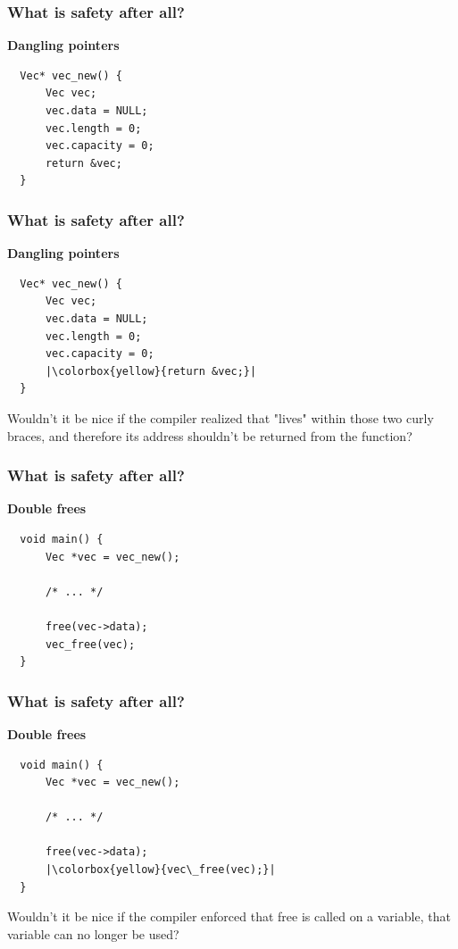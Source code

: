 \documentclass[aspectratio=1610,t]{beamer}
\begin{document}

\begin{frame}[fragile]
\frametitle{What is safety after all?}
\textbf{Dangling pointers}

\begin{verbatim}
  Vec* vec_new() {
      Vec vec;
      vec.data = NULL;
      vec.length = 0;
      vec.capacity = 0;
      return &vec;
  }
\end{verbatim}

\end{frame}


\begin{frame}[fragile]
\frametitle{What is safety after all?}
\textbf{Dangling pointers}

\begin{verbatim}
  Vec* vec_new() {
      Vec vec;
      vec.data = NULL;
      vec.length = 0;
      vec.capacity = 0;
      |\colorbox{yellow}{return &vec;}|
  }
\end{verbatim}

Wouldn't it be nice if the compiler realized that  "lives" within those two curly braces, and therefore its address shouldn't be returned from the function?

\end{frame}


\begin{frame}[fragile]
\frametitle{What is safety after all?}
\textbf{Double frees}

\begin{verbatim}
  void main() {
      Vec *vec = vec_new();

      /* ... */

      free(vec->data);
      vec_free(vec);
  }
\end{verbatim}

\end{frame}


\begin{frame}[fragile]
\frametitle{What is safety after all?}
\textbf{Double frees}

\begin{verbatim}
  void main() {
      Vec *vec = vec_new();

      /* ... */

      free(vec->data);
      |\colorbox{yellow}{vec\_free(vec);}|
  }
\end{verbatim}

Wouldn't it be nice if the compiler enforced that free is called on a variable, that variable can no longer be used?

\end{frame}
\end{document}

